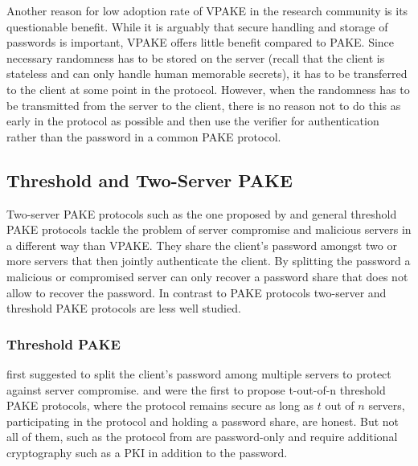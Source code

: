 Another reason for low adoption rate of \ac{VPAKE} in the research community is its questionable benefit.
While it is arguably that secure handling and storage of passwords is important, \ac{VPAKE} offers little benefit compared to \ac{PAKE}.
Since necessary randomness has to be stored on the server (recall that the client is stateless and can only handle human memorable secrets), it has to be transferred to the client at some point in the protocol.
However, when the randomness has to be transmitted from the server to the client, there is no reason not to do this as early in the protocol as possible and then use the verifier for authentication rather than the password in a common \ac{PAKE} protocol.


\subsection{Threshold and Two-Server PAKE}
Two-server PAKE protocols such as the one proposed by \citet{Abdalla2005} and general threshold \ac{PAKE} protocols \cite{MacKenzieSJ02,RaimondoG03,Abdalla2005b} tackle the problem of server compromise and malicious servers in a different way than \ac{VPAKE}.
They share the client's password amongst two or more servers that then jointly authenticate the client.
By splitting the password a malicious or compromised server can only recover a password share that does not allow to recover the password.
In contrast to \ac{PAKE} protocols two-server and threshold \ac{PAKE} protocols are less well studied.

\subsubsection{Threshold PAKE}
\citet{FordK00} first suggested to split the client's password among multiple servers to protect against server compromise.
\citet{RaimondoG03} and \citet{MacKenzieSJ02} were the first to propose t-out-of-n threshold \ac{PAKE} protocols, where the protocol remains secure as long as $t$ out of $n$ servers, participating in the protocol and holding a password share, are honest.
But not all of them, such as the protocol from \citet{MacKenzieSJ02} are password-only and require additional cryptography such as a PKI in addition to the password.

